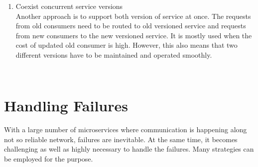 \begin{enumerate}
\item Coexist concurrent service versions \\ Another approach is to support both version of service at once. The requests from old consumers need to be routed to old versioned service and requests from new consumers to the new versioned service. It is mostly used when the cost of updated old consumer is high. However, this also means that two different versions have to be maintained and operated smoothly.
\end{enumerate}
\\
\section{Handling Failures}\label{section:challanges_of_microservices_architecture/handling_failures}
With a large number of microservices where communication is happening along not so reliable network, failures are inevitable. At the same time, it becomes challenging as well as highly necessary to handle the failures. Many strategies can be employed for the purpose. \cite{Newman:2015aa}\cite{Richardson:2015ab}\cite{Nygard:2007aa}
